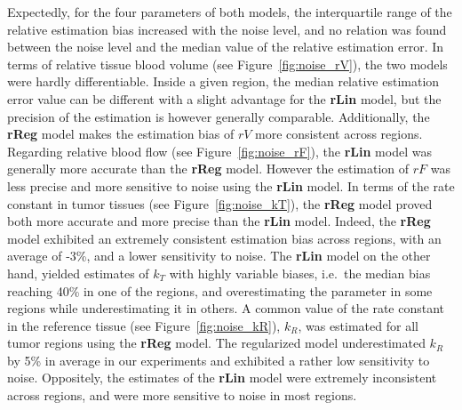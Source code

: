 Expectedly, for the four parameters of both models, the interquartile range of the relative estimation bias increased with the noise level, and no relation was found between the noise level and the median value of the relative estimation error.
In terms of relative tissue blood volume (see Figure~\ref{fig:noise_rV}), the two models were hardly differentiable.
Inside a given region, the median relative estimation error value can be different with a slight advantage for the \textbf{rLin} model, but the precision of the estimation is however generally comparable.
Additionally, the \textbf{rReg} model makes the estimation bias of $rV$ more consistent across regions.
Regarding relative blood flow (see Figure~\ref{fig:noise_rF}), the \textbf{rLin} model was generally more accurate than the \textbf{rReg} model. 
However the estimation of $rF$ was less precise and more sensitive to noise using the \textbf{rLin} model.
In terms of the rate constant in tumor tissues (see Figure~\ref{fig:noise_kT}), the \textbf{rReg} model proved both more accurate and more precise than the \textbf{rLin} model.
Indeed, the \textbf{rReg} model exhibited an extremely consistent estimation bias across regions, with an average of -3\%, and a lower sensitivity to noise.
The \textbf{rLin} model on the other hand, yielded estimates of $k_T$ with highly variable biases, i.e.~the median bias reaching 40\% in one of the regions, and overestimating the parameter in some regions while underestimating it in others.
A common value of the rate constant in the reference tissue (see Figure~\ref{fig:noise_kR}), $k_R$, was estimated for all tumor regions using the \textbf{rReg} model.
The regularized model underestimated $k_R$ by 5\% in average in our experiments and exhibited a rather low sensitivity to noise. 
Oppositely, the estimates of the \textbf{rLin} model were extremely inconsistent across regions, and were more sensitive to noise in most regions.

